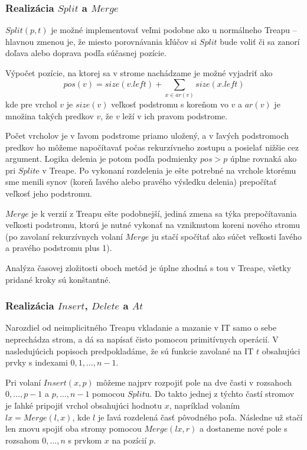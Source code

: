 \documentclass[a4paper, 12pt]{article}
\theoremstyle{definition}
\begin{document}
\subsubsection{Realizácia $Split$ a $Merge$}

$Split(p, t)$ je možné implementovať veľmi podobne ako u normálneho Treapu --
hlavnou zmenou je, že miesto porovnávania kľúčov si $Split$ bude voliť či sa
zanorí doľava alebo doprava podľa súčasnej pozície.

Výpočet pozície, na ktorej sa v strome nachádzame je možné vyjadriť ako
$$
pos(v) = size(v.left) + \sum_{x \in ar(v)} size(x.left)
$$
kde pre vrchol $v$ je $size(v)$ veľkosť podstromu s koreňom vo $v$ a $ar(v)$ je
množina takých predkov $v$, že $v$ leží v ich pravom podstrome.

Počet vrcholov je v ľavom podstrome priamo uložený, a v ľavých podstromoch
predkov ho môžeme napočítavať počas rekurzívneho zostupu a posielať nižšie cez
argument. Logika delenia je potom podľa podmienky $pos > p$ úplne rovnaká ako
pri $Split$e v Treape. Po vykonaní rozdelenia je ešte potrebné na vrchole
ktorému sme menili synov (koreň ľavého alebo pravého výsledku delenia)
prepočítať veľkosť jeho podstromu.

\bigskip

$Merge$ je k verzií z Treapu ešte podobnejší, jediná zmena sa týka
prepočítavania veľkosti podstromu, ktorú je nutné vykonať na vzniknutom koreni
nového stromu (po zavolaní rekurzívnych volaní $Merge$ ju stačí spočítať ako
súčet veľkosti ľavého a pravého podstromu plus 1).

\bigskip

Analýza časovej zložitosti oboch metód je úplne zhodná s tou v Treape, všetky
pridané kroky sú konštantné.

\subsubsection{Realizácia $Insert$, $Delete$ a $At$}

Narozdiel od neimplicitného Treapu vkladanie a mazanie v IT samo o sebe
neprechádza strom, a dá sa napísať čisto pomocou primitívnych operácií. V
nasledujúcich popisoch predpokladáme, že sú funkcie zavolané na IT $t$
obsahujúci prvky s indexami $0, 1, \ldots, n-1$.

\bigskip

Pri volaní $Insert(x, p)$ môžeme najprv rozpojiť pole na dve časti v rozsahoch
$0, \ldots, p-1$ a $p, \ldots, n-1$ pomocou $Split$u. Do takto jednej z týchto
častí stromov je ľahké pripojiť vrchol obsahujúci hodnotu $x$, napríklad
volaním $lx = Merge(l, x)$, kde $l$ je ľavá rozdelená časť pôvodného poľa.
Následne už stačí len znovu spojiť oba stromy pomocou $Merge(lx, r)$ a
dostaneme nové pole s rozsahom $0, \ldots, n$ s prvkom $x$ na pozícií $p$.
\end{document}
